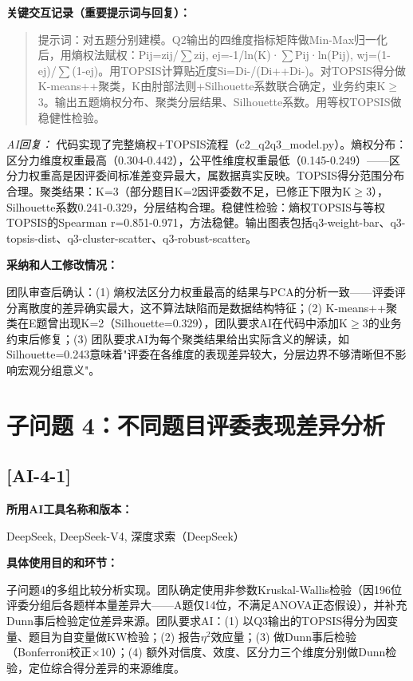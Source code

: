 \documentclass[12pt,a4paper]{ctexart}
\begin{document}
\textbf{关键交互记录（重要提示词与回复）：}\par

\begin{quote}
提示词：对五题分别建模。Q2输出的四维度指标矩阵做Min-Max归一化后，用熵权法赋权：Pij=zij/$\sum$zij, ej=-1/ln(K)·$\sum$Pij·ln(Pij), wj=(1-ej)/$\sum$(1-ej)。用TOPSIS计算贴近度Si=Di-/(Di++Di-)。对TOPSIS得分做K-means++聚类，K由肘部法则+Silhouette系数联合确定，业务约束K$\geq$3。输出五题熵权分布、聚类分层结果、Silhouette系数。用等权TOPSIS做稳健性检验。
\end{quote}

\textit{AI回复：} 代码实现了完整熵权+TOPSIS流程（c2\_q2q3\_model.py）。熵权分布：区分力维度权重最高（0.304-0.442），公平性维度权重最低（0.145-0.249）——区分力权重高是因评委间标准差变异最大，属数据真实反映。TOPSIS得分范围分布合理。聚类结果：K=3（部分题目K=2因评委数不足，已修正下限为K$\geq$3），Silhouette系数0.241-0.329，分层结构合理。稳健性检验：熵权TOPSIS与等权TOPSIS的Spearman r=0.851-0.971，方法稳健。输出图表包括q3-weight-bar、q3-topsis-dist、q3-cluster-scatter、q3-robust-scatter。

\textbf{采纳和人工修改情况：}\par
团队审查后确认：(1) 熵权法区分力权重最高的结果与PCA的分析一致——评委评分离散度的差异确实最大，这不算法缺陷而是数据结构特征；(2) K-means++聚类在E题曾出现K=2（Silhouette=0.329），团队要求AI在代码中添加K$\geq$3的业务约束后修复；(3) 团队要求AI为每个聚类结果给出实际含义的解读，如Silhouette=0.243意味着"评委在各维度的表现差异较大，分层边界不够清晰但不影响宏观分组意义"。

\section*{子问题 4：不同题目评委表现差异分析}

\subsection*{[AI-4-1]}

\textbf{所用AI工具名称和版本：}\par
DeepSeek, DeepSeek-V4, 深度求索（DeepSeek）

\textbf{具体使用目的和环节：}\par
子问题4的多组比较分析实现。团队确定使用非参数Kruskal-Wallis检验（因196位评委分组后各题样本量差异大——A题仅14位，不满足ANOVA正态假设），并补充Dunn事后检验定位差异来源。团队要求AI：(1) 以Q3输出的TOPSIS得分为因变量、题目为自变量做KW检验；(2) 报告$\eta^2$效应量；(3) 做Dunn事后检验（Bonferroni校正×10）；(4) 额外对信度、效度、区分力三个维度分别做Dunn检验，定位综合得分差异的来源维度。
\end{document}

